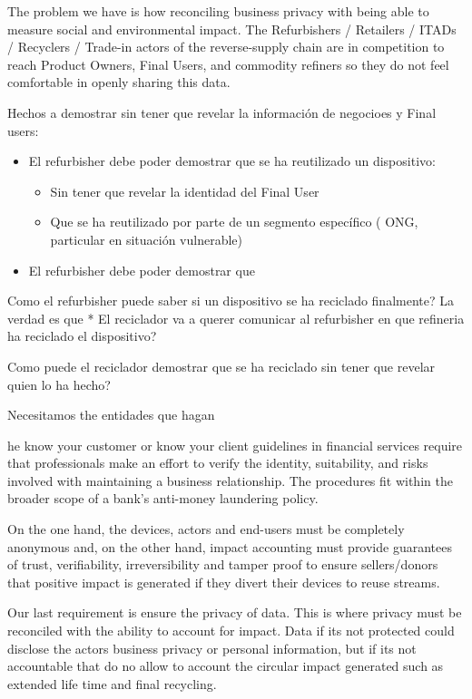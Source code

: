 \documentclass[
]{book}
\providecommand{\tightlist}{%
  \setlength{\itemsep}{0pt}\setlength{\parskip}{0pt}}
\begin{document}
The problem we have is how reconciling business privacy with being able to measure social and environmental impact. The Refurbishers / Retailers / ITADs / Recyclers / Trade-in actors of the reverse-supply chain are in competition to reach Product Owners, Final Users, and commodity refiners so they do not feel comfortable in openly sharing this data.

Hechos a demostrar sin tener que revelar la información de negocioes y Final users:

\begin{itemize}
\item
  El refurbisher debe poder demostrar que se ha reutilizado un dispositivo:

  \begin{itemize}
  \tightlist
  \item
    Sin tener que revelar la identidad del Final User
  \item
    Que se ha reutilizado por parte de un segmento específico ( ONG, particular en situación vulnerable)
  \end{itemize}
\item
  El refurbisher debe poder demostrar que
\end{itemize}

Como el refurbisher puede saber si un dispositivo se ha reciclado finalmente? La verdad es que * El reciclador va a querer comunicar al refurbisher en que refineria ha reciclado el dispositivo?

Como puede el reciclador demostrar que se ha reciclado sin tener que revelar quien lo ha hecho?

Necesitamos the entidades que hagan

he know your customer or know your client guidelines in financial services require that professionals make an effort to verify the identity, suitability, and risks involved with maintaining a business relationship. The procedures fit within the broader scope of a bank's anti-money laundering policy.

On the one hand, the devices, actors and end-users must be completely anonymous and, on the other hand, impact accounting must provide guarantees of trust, verifiability, irreversibility and tamper proof to ensure sellers/donors that positive impact is generated if they divert their devices to reuse streams.

Our last requirement is ensure the privacy of data. This is where privacy must be reconciled with the ability to account for impact. Data if its not protected could disclose the actors business privacy or personal information, but if its not accountable that do no allow to account the circular impact generated such as extended life time and final recycling.
\end{document}
